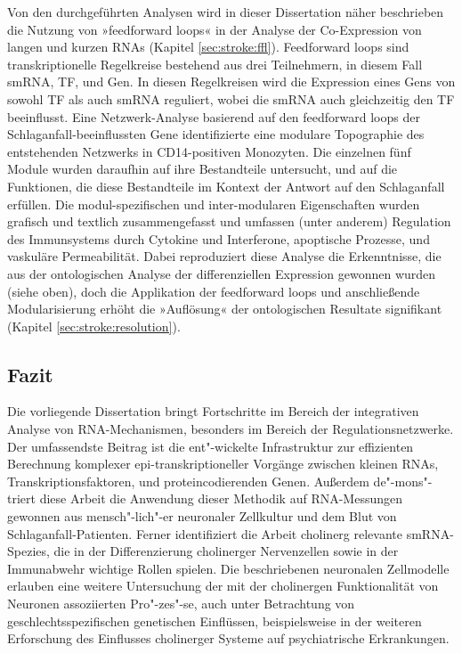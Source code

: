 Von den durchgeführten Analysen wird in dieser Dissertation näher beschrieben die Nutzung von »feedforward loops« in der Analyse der Co-Expression von langen und kurzen RNAs (Kapitel \ref{sec:stroke:ffl}). Feedforward loops sind transkriptionelle Regelkreise bestehend aus drei Teilnehmern, in diesem Fall smRNA, TF, und Gen. In diesen Regelkreisen wird die Expression eines Gens von sowohl TF als auch smRNA reguliert, wobei die smRNA auch gleichzeitig den TF beeinflusst. Eine Netzwerk-Analyse basierend auf den feedforward loops der Schlaganfall-beeinflussten Gene identifizierte eine modulare Topographie des entstehenden Netzwerks in CD14-positiven Monozyten. Die einzelnen fünf Module wurden daraufhin auf ihre Bestandteile untersucht, und auf die Funktionen, die diese Bestandteile im Kontext der Antwort auf den Schlaganfall erfüllen. Die modul-spezifischen und inter-modularen Eigenschaften wurden grafisch und textlich zusammengefasst und umfassen (unter anderem) Regulation des Immunsystems durch Cytokine und Interferone, apoptische Prozesse, und vaskuläre Permeabilität. Dabei reproduziert diese Analyse die Erkenntnisse, die aus der ontologischen Analyse der differenziellen Expression gewonnen wurden (siehe oben), doch die Applikation der feedforward loops und anschließende Modularisierung erhöht die »Auflösung« der ontologischen Resultate signifikant (Kapitel \ref{sec:stroke:resolution}).

\subsection{Fazit}
Die vorliegende Dissertation bringt Fortschritte im Bereich der integrativen Analyse von RNA-Mechanismen, besonders im Bereich der Regulationsnetzwerke. Der umfassendste Beitrag ist die ent"-wickelte Infrastruktur zur effizienten Berechnung komplexer epi-transkriptioneller Vorgänge zwischen kleinen RNAs, Transkriptionsfaktoren, und proteincodierenden Genen. Außerdem de"-mons"-triert diese Arbeit die Anwendung dieser Methodik auf RNA-Messungen gewonnen aus mensch"-lich"-er neuronaler Zellkultur und dem Blut von Schlaganfall-Patienten. Ferner identifiziert die Arbeit cholinerg relevante smRNA-Spezies, die in der Differenzierung cholinerger Nervenzellen sowie in der Immunabwehr wichtige Rollen spielen. Die beschriebenen neuronalen Zellmodelle erlauben eine weitere Untersuchung der mit der cholinergen Funktionalität von Neuronen assoziierten Pro"-zes"-se, auch unter Betrachtung von geschlechtsspezifischen genetischen Einflüssen, beispielsweise in der weiteren Erforschung des Einflusses cholinerger Systeme auf psychiatrische Erkrankungen.

